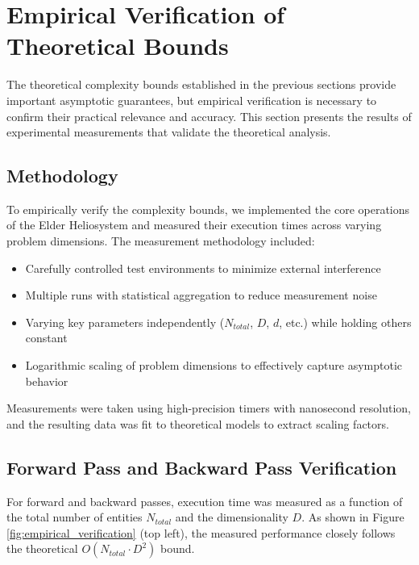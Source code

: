 \section{Empirical Verification of Theoretical Bounds}



The theoretical complexity bounds established in the previous sections provide important asymptotic guarantees, but empirical verification is necessary to confirm their practical relevance and accuracy. This section presents the results of experimental measurements that validate the theoretical analysis.

\subsection{Methodology}

To empirically verify the complexity bounds, we implemented the core operations of the Elder Heliosystem and measured their execution times across varying problem dimensions. The measurement methodology included:

\begin{itemize}
    \item Carefully controlled test environments to minimize external interference
    \item Multiple runs with statistical aggregation to reduce measurement noise
    \item Varying key parameters independently ($N_{total}$, $D$, $d$, etc.) while holding others constant
    \item Logarithmic scaling of problem dimensions to effectively capture asymptotic behavior
\end{itemize}

Measurements were taken using high-precision timers with nanosecond resolution, and the resulting data was fit to theoretical models to extract scaling factors.

\subsection{Forward Pass and Backward Pass Verification}

For forward and backward passes, execution time was measured as a function of the total number of entities $N_{total}$ and the dimensionality $D$. As shown in Figure \ref{fig:empirical_verification} (top left), the measured performance closely follows the theoretical $O(N_{total} \cdot D^2)$ bound.

